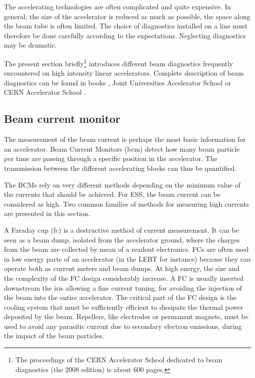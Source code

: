 \begin{refsection}
  The accelerating technologies are often complicated and quite expensive. In general, the size of the accelerator is reduced as much as possible, the space along the beam tube is often limited. The choice of diagnostics installed on a line must therefore be done carefully according to the expectations. Neglecting diagnostics may be dramatic.

  The present section briefly\footnote{The proceedings of the CERN Accelerator School dedicated to beam diagnostics (the 2008 edition) is about 600 pages.} introduces different beam diagnostics frequently encountered on high intensity linear accelerators. Complete description of beam diagnostics can be found in books \cite{strehl2006}, Joint Universities Accelerator School \cite{juas2019} or CERN Accelerator School \cite{cas2019}.

  \subsection{Beam current monitor}
  The measurement of the beam current is perhaps the most basic information for an accelerator. Beam Current Monitors (\acrshort{bcm}) detect how many beam particle per time are passing through a specific position in the accelerator. The transmission between the different accelerating blocks can thus be quantified.

  The BCMs rely on very different methods depending on the minimum value of the currents that should be achieved. For ESS, the beam current can be considered as high. Two common families of methods for measuring high currents are presented in this section.

  A Faraday cup (\acrshort{fc}) is a destructive method of current measurement. It can be seen as a beam dump, isolated from the accelerator ground, where the charges from the beam are collected by mean of a readout electronics. FCs are often used in low energy parts of an accelerator (in the LEBT for instance) because they can operate both as current meters and beam dumps. At high energy, the size and the complexity of the FC design considerably increase. A FC is usually inserted downstream the iris allowing a fine current tuning, for avoiding the injection of the beam into the entire accelerator. The critical part of the FC design is the cooling system that must be sufficiently efficient to dissipate the thermal power deposited by the beam. Repellers, like electrodes or permanent magnets, must be used to avoid any parasitic current due to secondary electron emissions, during the impact of the beam particles.


\end{refsection}
